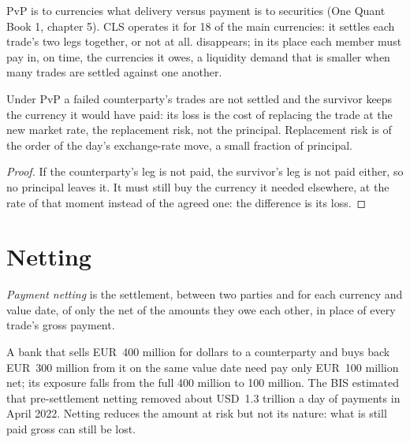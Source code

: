 PvP is to currencies what delivery versus payment is to securities (One Quant
Book 1, chapter 5). CLS operates it for 18 of the main currencies: it settles
each trade's two legs together, or not at all.  disappears; in its
place each member must pay in, on time, the currencies it owes, a liquidity demand
that is smaller when many trades are settled against one another.

\begin{proposition}\label{prop:m2:settlement-risk:pvp}
Under PvP a failed counterparty's trades are not settled and the survivor keeps
the currency it would have paid: its loss is the cost of replacing the trade at
the new market rate, the replacement risk, not the principal. Replacement risk is
of the order of the day's exchange-rate move, a small fraction of principal.
\end{proposition}

\begin{proof}
If the counterparty's leg is not paid, the survivor's leg is not paid either, so
no principal leaves it. It must still buy the currency it needed elsewhere, at the
rate of that moment instead of the agreed one: the difference is its loss.
\end{proof}

\section{Netting}

\begin{definition}\label{def:m2:settlement-risk:netting}
\emph{Payment netting} is the settlement, between two
parties and for each currency and value date, of only the net of the amounts they
owe each other, in place of every trade's gross payment.
\end{definition}

A bank that sells EUR~400 million for dollars to a counterparty and buys back
EUR~300 million from it on the same value date need pay only EUR~100 million net;
its exposure falls from the full 400 million to 100 million. The BIS estimated
that pre-settlement netting removed about USD~1.3 trillion a day of payments in
April 2022. Netting reduces the amount at risk but not its nature: what is still
paid gross can still be lost.

